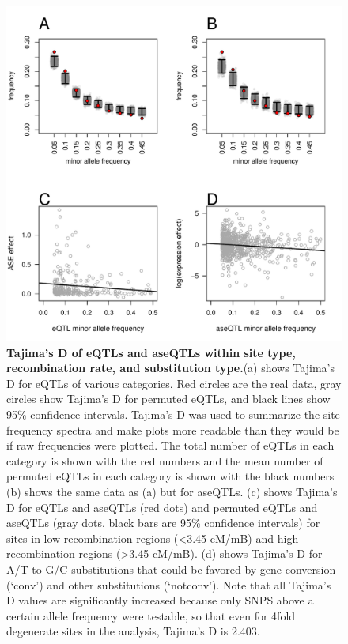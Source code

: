 \begin{figure}[ht]
      \centering
       \includegraphics[width=\linewidth]{Ch3FigS5}
    \caption{\textbf{Tajima’s D of eQTLs and aseQTLs within site type, recombination rate, and substitution type.}(a) shows Tajima’s D for eQTLs of various categories. Red circles are the real data, gray circles show Tajima’s D for permuted eQTLs, and black lines show 95\% confidence intervals. Tajima’s D was used to summarize the site frequency spectra and make plots more readable than they would be if raw frequencies were plotted. The total number of eQTLs in each category is shown with the red numbers and the mean number of permuted eQTLs in each category is shown with the black numbers (b) shows the same data as (a) but for aseQTLs. (c) shows Tajima’s D for eQTLs and aseQTLs (red dots) and permuted eQTLs and aseQTLs (gray dots, black bars are 95\% confidence intervals) for sites in low recombination regions (\textless 3.45 cM/mB) and high recombination regions (\textgreater 3.45 cM/mB). (d) shows Tajima’s D for A/T to G/C substitutions that could be favored by gene conversion (‘conv’) and other substitutions (‘notconv’). Note that all Tajima’s D values are significantly increased because only SNPS above a certain allele frequency were testable, so that even for 4\-fold degenerate sites in the analysis, Tajima’s D is 2.403.}
    \label{fig:3figS5}
\end{figure}


